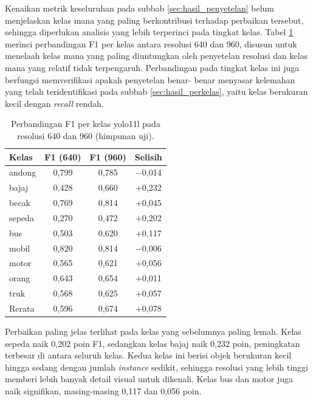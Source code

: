 Kenaikan metrik keseluruhan pada subbab \ref{sec:hasil_penyetelan} belum menjelaskan kelas 
mana yang paling berkontribusi terhadap perbaikan tersebut, sehingga diperlukan analisis 
yang lebih terperinci pada tingkat kelas. Tabel \ref{tab:f1_penyetelan} merinci perbandingan 
F1 per kelas antara resolusi 640 dan 960, disusun untuk menelaah kelas mana yang paling 
diuntungkan oleh penyetelan resolusi dan kelas mana yang relatif tidak terpengaruh. 
Perbandingan pada tingkat kelas ini juga berfungsi memverifikasi apakah penyetelan benar-
benar menyasar kelemahan yang telah teridentifikasi pada subbab \ref{sec:hasil_perkelas}, 
yaitu kelas berukuran kecil dengan \textit{recall} rendah.

\begin{table}[htbp]
    \centering
    \caption{Perbandingan F1 per kelas yolo11l pada resolusi 640 dan 960 (himpunan uji).}
    \label{tab:f1_penyetelan}
    \begin{tabular}{lccc}
        \hline
        \textbf{Kelas} & \textbf{F1 (640)} & \textbf{F1 (960)} & \textbf{Selisih} \\
        \hline \hline
        andong & 0,799 & 0,785 & $-$0,014 \\
        bajaj & 0,428 & 0,660 & +0,232 \\
        becak & 0,769 & 0,814 & +0,045 \\
        sepeda & 0,270 & 0,472 & +0,202 \\
        bus & 0,503 & 0,620 & +0,117 \\
        mobil & 0,820 & 0,814 & $-$0,006 \\
        motor & 0,565 & 0,621 & +0,056 \\
        orang & 0,643 & 0,654 & +0,011 \\
        truk & 0,568 & 0,625 & +0,057 \\
        \hline
        Rerata & 0,596 & 0,674 & +0,078 \\
        \hline
    \end{tabular}
\end{table}

Perbaikan paling jelas terlihat pada kelas yang sebelumnya paling lemah. Kelas sepeda naik 
0,202 poin F1, sedangkan kelas bajaj naik 0,232 poin, peningkatan terbesar di antara seluruh 
kelas. Kedua kelas ini berisi objek berukuran kecil hingga sedang dengan jumlah 
\textit{instance} sedikit, sehingga resolusi yang lebih tinggi memberi lebih banyak detail 
visual untuk dikenali. Kelas bus dan motor juga naik signifikan, masing-masing 0,117 dan 
0,056 poin.

